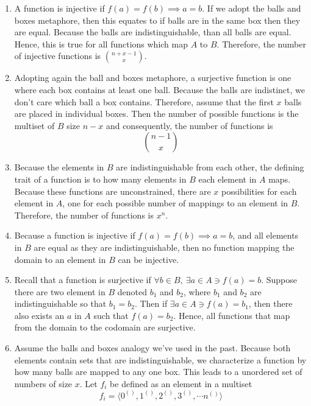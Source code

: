 \documentclass{article}
\begin{document}
\begin{enumerate}
\item A function is injective if $f(a) = f(b) \implies a = b$. If we adopt the balls and boxes metaphore, then this equates to if balls are in the same box then they are equal. Because the balls are indistinguishable, than all balls are equal. Hence, this is true for all functions which map $A$ to $B$. Therefore, the number of injective functions is ${n + x - 1 \choose x}$. 
\item Adopting again the ball and boxes metaphore, a surjective function is one where each box contains at least one ball. Because the balls are indistinct, we don't care which ball a box contains. Therefore, assume that the first $x$ balls are placed in individual boxes. Then the number of possible functions is the multiset of $B$ size $n - x$ and consequently, the number of functions is 
\begin{equation*}
	{n - 1 \choose x}
\end{equation*} 
\item Because the elements in $B$ are indistinguishable from each other, the defining trait of a function is to how many elements in $B$ each element in $A$ maps. Because these functions are unconstrained, there are $x$ possibilities for each element in $A$, one for each possible number of mappings to an element in $B$. Therefore, the number of functions is $x^n$. 
\item Because a function is injective if $f(a) = f(b) \implies a = b$, and all elements in $B$ are equal as they are indistinguishable, then no function mapping the domain to an element in $B$ can be injective. 
\item Recall that a function is surjective if $\forall b \in B, \ \exists a \in A \ni f(a) = b$. Suppose there are two element in $B$ denoted $b_1$ and $b_2$, where $b_1$ and $b_2$ are indistinguishable so that $b_1 = b_2$. Then if $\exists a \in A \ni f(a) = b_1$, then there also exists an $a$ in $A$ such that $f(a) = b_2$. Hence, all functions that map from the domain to the codomain are surjective. 
\item Assume the balls and boxes analogy we've used in the past. Because both elements contain sets that are indistinguishable, we characterize a function by how many balls are mapped to any one box. This leads to a unordered set of numbers of size $x$. Let $f_i$ be defined as an element in a multiset
\begin{equation*}
	f_i = \langle 0^{()}, 1^{()}, 2^{()}, 3^{()}, \cdots n^{()}\rangle
\end{equation*}

\end{enumerate}
\end{document}
